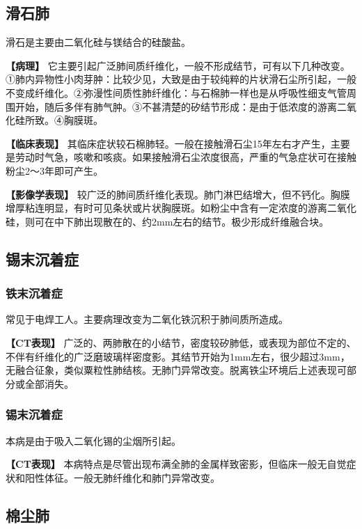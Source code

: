 \subsection{滑石肺}

滑石是主要由二氧化硅与镁结合的硅酸盐。

\textbf{【病理】}
它主要引起广泛肺间质纤维化，一般不形成结节，可有以下几种改变。①肺内异物性小肉芽肿：比较少见，大致是由于较纯粹的片状滑石尘所引起，一般不变成纤维化。②弥漫性间质性肺纤维化：与石棉肺一样也是从呼吸性细支气管周围开始，随后多伴有肺气肿。③不甚清楚的矽结节形成：是由于低浓度的游离二氧化硅所致。④胸膜斑。

\textbf{【临床表现】}
其临床症状较石棉肺轻。一般在接触滑石尘15年左右才产生，主要是劳动时气急，咳嗽和咳痰。如果接触滑石尘浓度很高，严重的气急症状可在接触粉尘2～3年即可产生。

\textbf{【影像学表现】}
较广泛的肺间质纤维化表现。肺门淋巴结增大，但不钙化。胸膜增厚粘连明显，有时可见条状或片状胸膜斑。如粉尘中含有一定浓度的游离二氧化硅，则可在中下肺出现散在的、约2mm左右的结节。极少形成纤维融合块。

\subsection{锡末沉着症}

\subsubsection{铁末沉着症}

常见于电焊工人。主要病理改变为二氧化铁沉积于肺间质所造成。

\textbf{【CT表现】}
广泛的、两肺散在的小结节，密度较矽肺低，或表现为部位不定的、不伴有纤维化的广泛磨玻璃样密度影。其结节开始为1mm左右，很少超过3mm，无融合征象，类似粟粒性肺结核。无肺门异常改变。脱离铁尘环境后上述表现可部分或全部消失。

\subsubsection{锡末沉着症}

本病是由于吸入二氧化锡的尘烟所引起。

\textbf{【CT表现】}
本病特点是尽管出现布满全肺的金属样致密影，但临床一般无自觉症状和阳性体征。一般无肺纤维化和肺门异常改变。

\subsection{棉尘肺}

